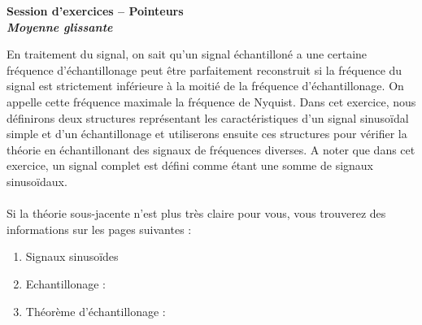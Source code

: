 \documentclass[11pt]{article}
\begin{document}
\begin{center}{\bf Session d'exercices -- Pointeurs}\\
\textbf{\emph{Moyenne glissante}}
\end{center}
En traitement du signal, on sait qu'un signal échantilloné a une certaine fréquence d'échantillonage peut être parfaitement reconstruit si la fréquence du signal est strictement inférieure à la moitié de la fréquence d'échantillonage. On appelle cette fréquence maximale la fréquence de Nyquist. Dans cet exercice, nous définirons deux structures représentant les caractéristiques d'un signal sinusoïdal simple et d'un échantillonage et utiliserons ensuite ces structures pour vérifier la théorie en échantillonant des signaux de fréquences diverses. A noter que dans cet exercice, un signal complet est défini comme étant une somme de signaux sinusoïdaux.\\
\\
Si la théorie sous-jacente n'est plus très claire pour vous, vous trouverez des informations sur les pages suivantes : 
\begin{enumerate}
\item Signaux sinusoïdes %
\item Echantillonage :%
\item Théorème d'échantillonage : %
\end{enumerate}
\end{document}
